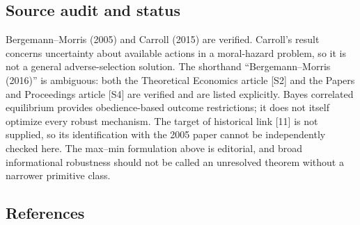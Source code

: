 \documentclass[11pt,a4paper]{article}
\begin{document}
\subsection*{Source audit and status}

Bergemann--Morris (2005) and Carroll (2015) are verified. Carroll's result concerns uncertainty about available actions in a moral-hazard problem, so it is not a general adverse-selection solution. The shorthand ``Bergemann--Morris (2016)'' is ambiguous: both the Theoretical Economics article [S2] and the Papers and Proceedings article [S4] are verified and are listed explicitly. Bayes correlated equilibrium provides obedience-based outcome restrictions; it does not itself optimize every robust mechanism. The target of historical link [11] is not supplied, so its identification with the 2005 paper cannot be independently checked here. The max--min formulation above is editorial, and broad informational robustness should not be called an unresolved theorem without a narrower primitive class.

\subsection*{References}
\end{document}
